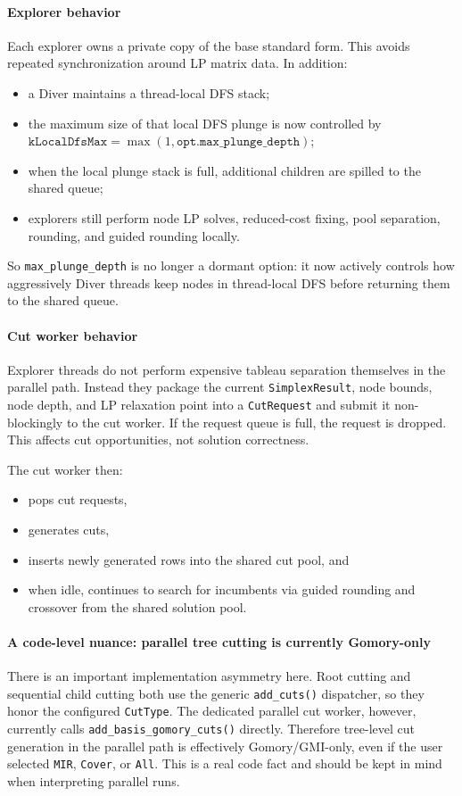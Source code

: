 \paragraph{Explorer behavior}
Each explorer owns a private copy of the base standard form. This avoids repeated synchronization around LP matrix data. In addition:
\begin{itemize}
  \item a Diver maintains a thread-local DFS stack;
  \item the maximum size of that local DFS plunge is now controlled by
        \(\texttt{kLocalDfsMax} = \max(1, \texttt{opt.max\_plunge\_depth})\);
  \item when the local plunge stack is full, additional children are spilled to the shared queue;
  \item explorers still perform node LP solves, reduced-cost fixing, pool separation, rounding, and guided rounding locally.
\end{itemize}

So \texttt{max\_plunge\_depth} is no longer a dormant option: it now actively controls how aggressively Diver threads keep nodes in thread-local DFS before returning them to the shared queue.

\paragraph{Cut worker behavior}
Explorer threads do not perform expensive tableau separation themselves in the parallel path. Instead they package the current \texttt{SimplexResult}, node bounds, node depth, and LP relaxation point into a \texttt{CutRequest} and submit it non-blockingly to the cut worker.
If the request queue is full, the request is dropped. This affects cut opportunities, not solution correctness.

The cut worker then:
\begin{itemize}
  \item pops cut requests,
  \item generates cuts,
  \item inserts newly generated rows into the shared cut pool, and
  \item when idle, continues to search for incumbents via guided rounding and crossover from the shared solution pool.
\end{itemize}

\paragraph{A code-level nuance: parallel tree cutting is currently Gomory-only}
There is an important implementation asymmetry here. Root cutting and sequential child cutting both use the generic \texttt{add\_cuts()} dispatcher, so they honor the configured \texttt{CutType}. The dedicated parallel cut worker, however, currently calls \texttt{add\_basis\_gomory\_cuts()} directly. Therefore tree-level cut generation in the parallel path is effectively Gomory/GMI-only, even if the user selected \texttt{MIR}, \texttt{Cover}, or \texttt{All}. This is a real code fact and should be kept in mind when interpreting parallel runs.

